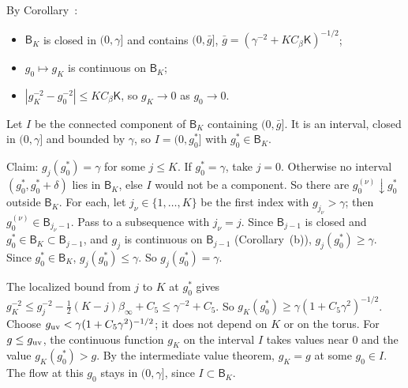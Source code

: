 \begin{step}
By Corollary~:
\begin{itemize}
\item $\mathsf B_K$ is closed in $(0,\gamma]$ and contains $(0,\bar g]$, $\bar g=(\gamma^{-2}+KC_\beta\mathsf K)^{-1/2}$;
\item $g_0\mapsto g_K$ is continuous on $\mathsf B_K$;
\item $|g_K^{-2}-g_0^{-2}|\le KC_\beta\mathsf K$, so $g_K\to0$ as $g_0\to0$.
\end{itemize}
Let $I$ be the connected component of $\mathsf B_K$ containing $(0,\bar g]$. It is an interval, closed in $(0,\gamma]$ and bounded by $\gamma$, so $I=(0,g_0^*]$ with $g_0^*\in\mathsf B_K$.

Claim: $g_j(g_0^*)=\gamma$ for some $j\le K$. If $g_0^*=\gamma$, take $j=0$. Otherwise no interval $(g_0^*,g_0^*+\delta)$ lies in $\mathsf B_K$, else $I$ would not be a component. So there are $g_0^{(\nu)}\downarrow g_0^*$ outside $\mathsf B_K$. For each, let $j_\nu\in\{1,\dots,K\}$ be the first index with $g_{j_\nu}>\gamma$; then $g_0^{(\nu)}\in\mathsf B_{j_\nu-1}$. Pass to a subsequence with $j_\nu=j$. Since $\mathsf B_{j-1}$ is closed and $g_0^*\in\mathsf B_K\subset\mathsf B_{j-1}$, and $g_j$ is continuous on $\mathsf B_{j-1}$ (Corollary~(b)), $g_j(g_0^*)\ge\gamma$. Since $g_0^*\in\mathsf B_K$, $g_j(g_0^*)\le\gamma$. So $g_j(g_0^*)=\gamma$.

The localized bound from $j$ to $K$ at $g_0^*$ gives $g_K^{-2}\le g_j^{-2}-\frac12(K-j)\beta_\infty+C_5\le\gamma^{-2}+C_5$. So $g_K(g_0^*)\ge\gamma(1+C_5\gamma^2)^{-1/2}$. Choose $g_{\rm uv}<\gamma(1+C_5\gamma^2)^{-1/2}$; it does not depend on $K$ or on the torus. For $g\le g_{\rm uv}$, the continuous function $g_K$ on the interval $I$ takes values near $0$ and the value $g_K(g_0^*)>g$. By the intermediate value theorem, $g_K=g$ at some $g_0\in I$. The flow at this $g_0$ stays in $(0,\gamma]$, since $I\subset\mathsf B_K$.
\end{step}

